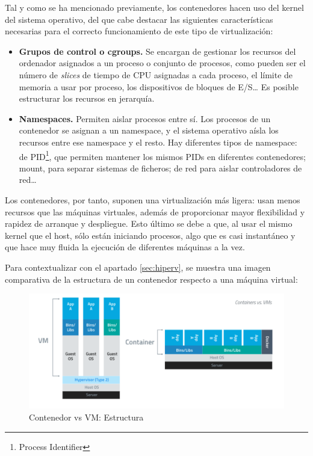 	Tal y como se ha mencionado previamente, los contenedores hacen uso del kernel del sistema operativo, del que cabe destacar las siguientes características necesarias para el correcto funcionamiento de este tipo de virtualización:~\cite{cont3}

	\begin{itemize}
		\item \textbf{Grupos de control o cgroups.} Se encargan de gestionar los recursos del ordenador asignados a un proceso o conjunto de procesos, como pueden ser el número de \textit{slices} de tiempo de CPU asignadas a cada proceso, el límite de memoria a usar por proceso, los dispositivos de bloques de E/S… Es posible estructurar los recursos en jerarquía.
		\item \textbf{Namespaces.} Permiten aislar procesos entre sí. Los procesos de un contenedor se asignan a un namespace, y el sistema operativo aísla los recursos entre ese namespace y el resto. Hay diferentes tipos de namespace: de PID\footnote{Process Identifier}, que permiten mantener los mismos PIDs en diferentes contenedores; mount, para separar sistemas de ficheros; de red para aislar controladores de red… 
	\end{itemize}

	Los contenedores, por tanto, suponen una virtualización más ligera: usan menos recursos que las máquinas virtuales, además de proporcionar mayor flexibilidad y rapidez de arranque y despliegue. Esto último se debe a que, al usar el mismo kernel que el host, sólo están iniciando procesos, algo que es casi instantáneo y que hace muy fluida la ejecución de diferentes máquinas a la vez.

	Para contextualizar con el apartado \ref{sec:hiperv}, se muestra una imagen comparativa de la estructura de un contenedor respecto a una máquina virtual:

	\begin{figure}[h]
	\centering
	\includegraphics[width=\textwidth]{../imgs/EdA/VMvsCont.png}
	\caption{Contenedor vs VM: Estructura}
	\label{fig:VMvsDocker}
	\end{figure}

